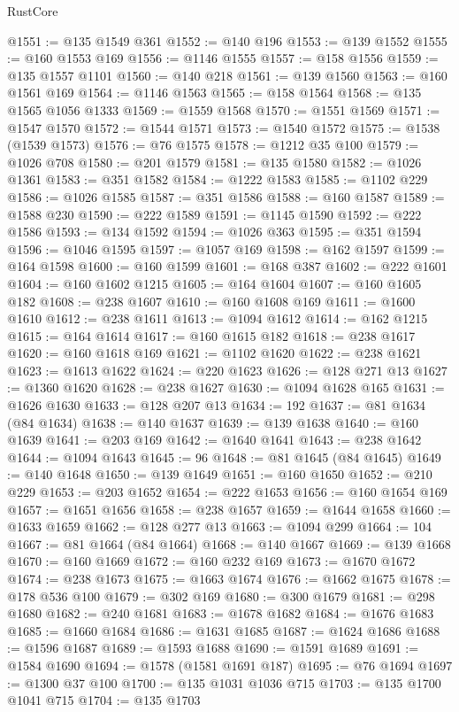 \begin{lexlean}{RustCore}
\begin{coremodule}
@1551 := @135 @1549 @361
@1552 := @140 @196
@1553 := @139 @1552
@1555 := @160 @1553 @169
@1556 := @1146 @1555
@1557 := @158 @1556
@1559 := @135 @1557 @1101
@1560 := @140 @218
@1561 := @139 @1560
@1563 := @160 @1561 @169
@1564 := @1146 @1563
@1565 := @158 @1564
@1568 := @135 @1565 @1056 @1333
@1569 := @1559 @1568
@1570 := @1551 @1569
@1571 := @1547 @1570
@1572 := @1544 @1571
@1573 := @1540 @1572
@1575 := @1538 (@1539 @1573)
@1576 := @76 @1575
@1578 := @1212 @35 @100
@1579 := @1026 @708
@1580 := @201 @1579
@1581 := @135 @1580
@1582 := @1026 @1361
@1583 := @351 @1582
@1584 := @1222 @1583
@1585 := @1102 @229
@1586 := @1026 @1585
@1587 := @351 @1586
@1588 := @160 @1587
@1589 := @1588 @230
@1590 := @222 @1589
@1591 := @1145 @1590
@1592 := @222 @1586
@1593 := @134 @1592
@1594 := @1026 @363
@1595 := @351 @1594
@1596 := @1046 @1595
@1597 := @1057 @169
@1598 := @162 @1597
@1599 := @164 @1598
@1600 := @160 @1599
@1601 := @168 @387
@1602 := @222 @1601
@1604 := @160 @1602 @1215
@1605 := @164 @1604
@1607 := @160 @1605 @182
@1608 := @238 @1607
@1610 := @160 @1608 @169
@1611 := @1600 @1610
@1612 := @238 @1611
@1613 := @1094 @1612
@1614 := @162 @1215
@1615 := @164 @1614
@1617 := @160 @1615 @182
@1618 := @238 @1617
@1620 := @160 @1618 @169
@1621 := @1102 @1620
@1622 := @238 @1621
@1623 := @1613 @1622
@1624 := @220 @1623
@1626 := @128 @271 @13
@1627 := @1360 @1620
@1628 := @238 @1627
@1630 := @1094 @1628 @165
@1631 := @1626 @1630
@1633 := @128 @207 @13
@1634 := 192
@1637 := @81 @1634 (@84 @1634)
@1638 := @140 @1637
@1639 := @139 @1638
@1640 := @160 @1639
@1641 := @203 @169
@1642 := @1640 @1641
@1643 := @238 @1642
@1644 := @1094 @1643
@1645 := 96
@1648 := @81 @1645 (@84 @1645)
@1649 := @140 @1648
@1650 := @139 @1649
@1651 := @160 @1650
@1652 := @210 @229
@1653 := @203 @1652
@1654 := @222 @1653
@1656 := @160 @1654 @169
@1657 := @1651 @1656
@1658 := @238 @1657
@1659 := @1644 @1658
@1660 := @1633 @1659
@1662 := @128 @277 @13
@1663 := @1094 @299
@1664 := 104
@1667 := @81 @1664 (@84 @1664)
@1668 := @140 @1667
@1669 := @139 @1668
@1670 := @160 @1669
@1672 := @160 @232 @169
@1673 := @1670 @1672
@1674 := @238 @1673
@1675 := @1663 @1674
@1676 := @1662 @1675
@1678 := @178 @536 @100
@1679 := @302 @169
@1680 := @300 @1679
@1681 := @298 @1680
@1682 := @240 @1681
@1683 := @1678 @1682
@1684 := @1676 @1683
@1685 := @1660 @1684
@1686 := @1631 @1685
@1687 := @1624 @1686
@1688 := @1596 @1687
@1689 := @1593 @1688
@1690 := @1591 @1689
@1691 := @1584 @1690
@1694 := @1578 (@1581 @1691 @187)
@1695 := @76 @1694
@1697 := @1300 @37 @100
@1700 := @135 @1031 @1036 @715
@1703 := @135 @1700 @1041 @715
@1704 := @135 @1703

\end{coremodule}
\end{lexlean}
